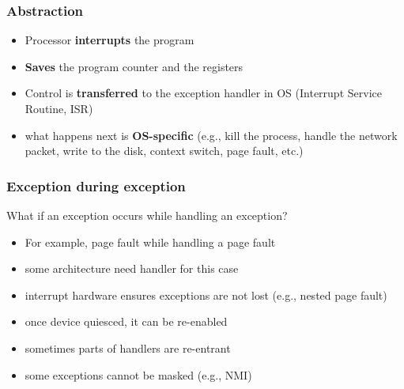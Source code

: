 \documentclass[letterpaper,12pt]{article}
\begin{document}
\subsubsection{Abstraction}
\begin{itemize}
    \item Processor \textbf{interrupts} the program
    \item \textbf{Saves} the program counter and the registers
    \item Control is \textbf{transferred} to the exception handler in OS (Interrupt Service Routine, ISR)
    \item what happens next is \textbf{OS-specific} (e.g., kill the process, handle the network packet, write to the disk, context switch, page fault, etc.)
\end{itemize}
\subsubsection{Exception during exception}
What if an exception occurs while handling an exception? \begin{itemize}
    \item For example, page fault while handling a page fault
    \item some architecture need handler for this case
    \item interrupt hardware ensures exceptions are not lost (e.g., nested page fault)
    \item once device quiesced, it can be re-enabled
    \item sometimes parts of handlers are re-entrant
    \item some exceptions cannot be masked (e.g., NMI)
\end{itemize}
\end{document}
